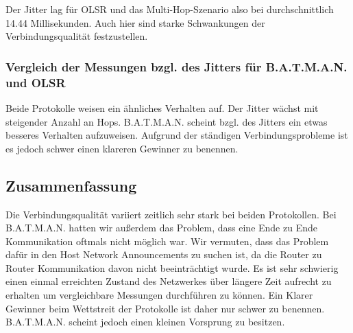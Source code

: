 \documentclass[a4paper,10pt]{article}
\begin{document}
Der Jitter lag für OLSR und das Multi-Hop-Szenario also bei durchschnittlich 14.44 Millisekunden.
Auch hier sind starke Schwankungen der Verbindungsqualität festzustellen.

\subsubsection{Vergleich der Messungen bzgl. des Jitters für B.A.T.M.A.N. und OLSR}

Beide Protokolle weisen ein ähnliches Verhalten auf.
Der Jitter wächst mit steigender Anzahl an Hops.
B.A.T.M.A.N. scheint bzgl. des Jitters ein etwas besseres Verhalten aufzuweisen.
Aufgrund der ständigen Verbindungsprobleme ist es jedoch schwer einen klareren Gewinner zu benennen.

\subsection{Zusammenfassung}

Die Verbindungsqualität variiert zeitlich sehr stark bei beiden Protokollen.
Bei B.A.T.M.A.N. hatten wir außerdem das Problem, dass eine Ende zu Ende Kommunikation oftmals nicht möglich war.
Wir vermuten, dass das Problem dafür in den Host Network Announcements zu suchen ist, da die Router zu Router Kommunikation davon nicht beeinträchtigt wurde.
Es ist sehr schwierig einen einmal erreichten Zustand des Netzwerkes über längere Zeit aufrecht zu erhalten um vergleichbare Messungen durchführen zu können.
Ein Klarer Gewinner beim Wettstreit der Protokolle ist daher nur schwer zu benennen.
B.A.T.M.A.N. scheint jedoch einen kleinen Vorsprung zu besitzen.
\end{document}
